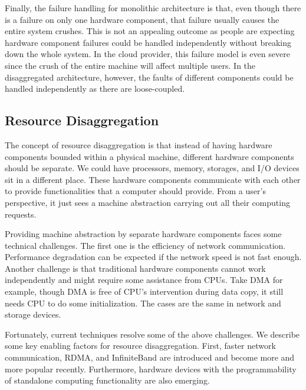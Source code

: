 \documentclass[twocolumn]{article}
\begin{document}
Finally, the failure handling for monolithic architecture is that, even though there is a failure on only one hardware component, that failure usually causes the entire system crushes. This is not an appealing outcome as people are expecting hardware component failures could be handled independently without breaking down the whole system. In the cloud provider, this failure model is even severe since the crush of the entire machine will affect multiple users. In the disaggregated architecture, however, the faults of different components could be handled independently as there are loose-coupled.

\subsection{Resource Disaggregation}
The concept of resource disaggregation is that instead of having hardware components bounded within a physical machine, different hardware components should be separate. We could have processors, memory, storages, and I/O devices sit in a different place. These hardware components communicate with each other to provide functionalities that a computer should provide. From a user's perspective, it just sees a machine abstraction carrying out all their computing requests.

Providing machine abstraction by separate hardware components faces some technical challenges\cite{Rack_scale_challenges}. The first one is the efficiency of network communication. Performance degradation can be expected if the network speed is not fast enough. Another challenge is that traditional hardware components cannot work independently and might require some assistance from CPUs. Take DMA for example, though DMA is free of CPU's intervention during data copy, it still needs CPU to do some initialization. The cases are the same in network and storage devices.

Fortunately, current techniques resolve some of the above challenges. We describe some key enabling factors for resource disaggregation. First, faster network communication\cite{R2C2}, RDMA\cite{RDMA}, and InfiniteBand\cite{InfiniteBand} are introduced and become more and more popular recently. Furthermore, hardware devices with the programmability of standalone computing functionality are also emerging\cite{PARDIS, PIM}.
\end{document}
